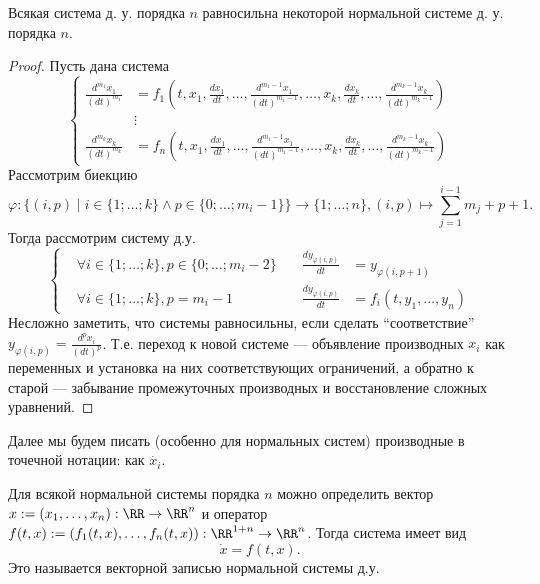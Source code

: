 \documentclass[12pt,a4paper]{article}
\begin{document}
    \begin{lemma}
        Всякая система д. у. порядка $n$ равносильна некоторой нормальной системе д. у. порядка $n$.
    \end{lemma}

    \begin{proof}
        Пусть дана система
        \[
            \left\{
                \begin{aligned}
                    \frac{d^{m_1}x_1}{(dt)^{m_1}} &= f_1\left(t, x_1, \frac{d x_1}{dt}, \dots, \frac{d^{m_1-1}x_1}{(dt)^{m_1-1}}, \dots, x_k, \frac{d x_k}{dt}, \dots, \frac{d^{m_k-1}x_k}{(dt)^{m_k-1}}\right)\\
                    &\vdots\\
                    \frac{d^{m_k}x_k}{(dt)^{m_k}} &= f_n\left(t, x_1, \frac{d x_1}{dt}, \dots, \frac{d^{m_1-1}x_1}{(dt)^{m_1-1}}, \dots, x_k, \frac{d x_k}{dt}, \dots, \frac{d^{m_k-1}x_k}{(dt)^{m_k-1}}\right)
                \end{aligned}
            \right.
        \]
        Рассмотрим биекцию
        \[\varphi: \{(i, p) \mid i \in \{1; \dots; k\} \wedge p \in \{0; \dots; m_i - 1\}\} \to \{1; \dots; n\}, (i, p) \mapsto \sum_{j=1}^{i-1} m_j + p + 1.\]
        Тогда рассмотрим систему д.у.
        \[
            \left\{
                \begin{aligned}
                    &\forall i \in \{1; \dots; k\}, p \in \{0; \dots; m_i-2\}& \quad \frac{d y_{\varphi(i, p)}}{dt} &= y_{\varphi(i, p+1)}\\
                    &\forall i \in \{1; \dots; k\}, p = m_i - 1& \quad \frac{d y_{\varphi(i, p)}}{dt} &= f_i(t, y_1, \dots, y_n)
                \end{aligned}
            \right.
        \]
        Несложно заметить, что системы равносильны, если сделать ``соответствие'' $y_{\varphi(i, p)} = \frac{d^p x_i}{(dt)^p}$. Т.е. переход к новой системе --- объявление производных $x_i$ как переменных и установка на них соответствующих ограничений, а обратно к старой --- забывание промежуточных производных и восстановление сложных уравнений.
    \end{proof}

    \begin{remark*}
        Далее мы будем писать (особенно для нормальных систем) производные в точечной нотации: как $\dot{x_i}$.
    \end{remark*}

    \begin{remark}
        Для всякой нормальной системы порядка $n$ можно определить вектор $x := (x_1, \dots, x_n): \RR \to \RR^n$ и оператор $f(t, x) := (f_1(t, x), \dots, f_n(t, x)) : \RR^{1+n} \to \RR^n$. Тогда система имеет вид
        \[\dot{x} = f(t, x).\]
        Это называется векторной записью нормальной системы д.у.
    \end{remark}
\end{document}
